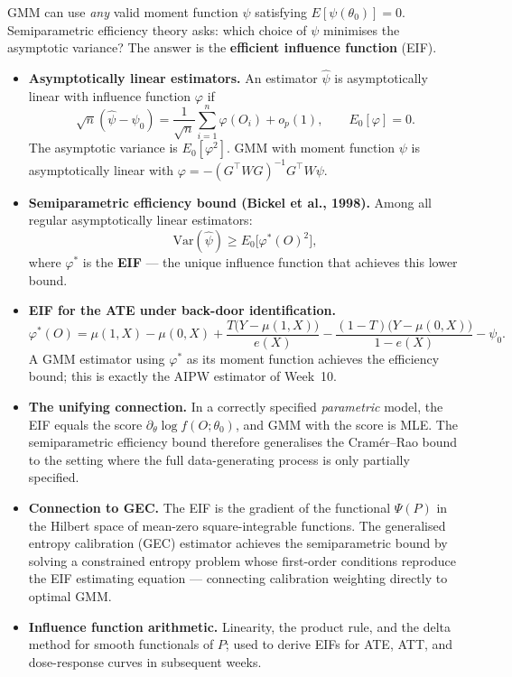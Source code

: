 \documentclass[12pt]{article}
\begin{document}
GMM can use \emph{any} valid moment function $\psi$ satisfying
$E[\psi(\theta_0)] = 0$.  Semiparametric efficiency theory asks:
which choice of $\psi$ minimises the asymptotic variance?  The answer
is the \textbf{efficient influence function} (EIF).

\begin{itemize}
  \item \textbf{Asymptotically linear estimators.}
    An estimator $\hat\psi$ is asymptotically linear with influence
    function $\varphi$ if
    \[
      \sqrt{n}(\hat\psi - \psi_0)
      = \frac{1}{\sqrt{n}}\sum_{i=1}^n \varphi(O_i) + o_p(1),
      \qquad E_0[\varphi] = 0.
    \]
    The asymptotic variance is $E_0[\varphi^2]$.  GMM with moment
    function $\psi$ is asymptotically linear with
    $\varphi = -(G^\top W G)^{-1} G^\top W \psi$.

  \item \textbf{Semiparametric efficiency bound (Bickel et al., 1998).}
    Among all regular asymptotically linear estimators:
    \[
      \mathrm{Var}(\hat\psi) \geq E_0\!\bigl[\varphi^*(O)^2\bigr],
    \]
    where $\varphi^*$ is the \textbf{EIF} --- the unique influence
    function that achieves this lower bound.

  \item \textbf{EIF for the ATE under back-door identification.}
    \[
      \varphi^*(O)
      = \mu(1,X) - \mu(0,X)
        + \frac{T\bigl(Y - \mu(1,X)\bigr)}{e(X)}
        - \frac{(1-T)\bigl(Y - \mu(0,X)\bigr)}{1 - e(X)}
        - \psi_0.
    \]
    A GMM estimator using $\varphi^*$ as its moment function achieves
    the efficiency bound; this is exactly the AIPW estimator of
    Week~10.

  \item \textbf{The unifying connection.}
    In a correctly specified \emph{parametric} model, the EIF equals
    the score $\partial_\theta \log f(O;\theta_0)$, and GMM with the
    score is MLE.  The semiparametric efficiency bound therefore
    generalises the Cram\'er--Rao bound to the setting where the
    full data-generating process is only partially specified.

  \item \textbf{Connection to GEC.}
    The EIF is the gradient of the functional $\Psi(P)$ in the Hilbert
    space of mean-zero square-integrable functions.  The generalised
    entropy calibration (GEC) estimator achieves the semiparametric
    bound by solving a constrained entropy problem whose first-order
    conditions reproduce the EIF estimating equation --- connecting
    calibration weighting directly to optimal GMM.

  \item \textbf{Influence function arithmetic.}
    Linearity, the product rule, and the delta method for smooth
    functionals of $P$; used to derive EIFs for ATE, ATT, and
    dose-response curves in subsequent weeks.
\end{itemize}
\end{document}
